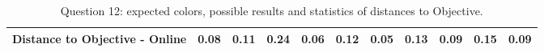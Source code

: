 \begin{table}[H]
{\begin{tabular}{lccccccccccccc}
    \multicolumn{4}{l}{Distance to Objective - Online}                                                                                               & \multicolumn{1}{|c}{\textbf{0.08}}        & \multicolumn{1}{c|}{0.11}    & \multicolumn{1}{|c}{0.24}        & \multicolumn{1}{c|}{0.06}    & \multicolumn{1}{|c}{0.12}       & \multicolumn{1}{c|}{0.05}    & \multicolumn{1}{|c}{0.13}        & \multicolumn{1}{c|}{0.09}    & \multicolumn{1}{|c}{0.15}       & \multicolumn{1}{c|}{0.09}    \\ \hline
    \end{tabular}}
  \caption[Question 12, with expected Results.]{Question 12: expected colors, possible results and statistics of distances to Objective.}
  \vspace{-5pt}
  \label{table:lab_q12_expected}
\end{table}
%
